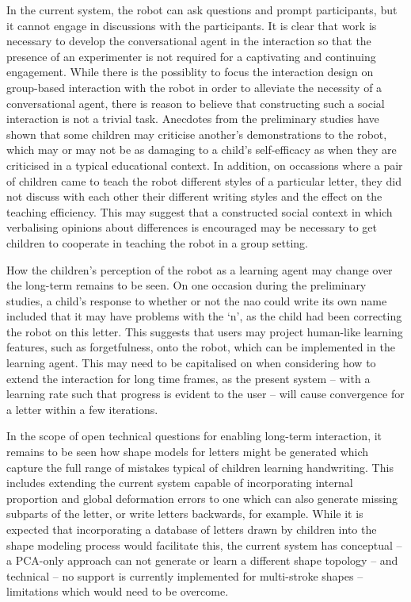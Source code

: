 \documentclass{sig-alternate}
\begin{document}
In the current system, the robot can ask questions and prompt participants, but it 
cannot engage in discussions with the participants. It is clear that work is necessary 
to develop the conversational agent in the interaction so that the presence of an 
experimenter is not required for a captivating and continuing engagement. While there is the 
possiblity to focus the interaction design on group-based interaction with the robot 
in order to alleviate the necessity of a conversational agent, there is reason to 
believe that constructing such a social interaction is not a trivial task. Anecdotes 
from the preliminary studies have shown that some children may criticise another's 
demonstrations to the robot, which may or may not be as damaging to a child's 
self-efficacy as when they are criticised in a typical educational context. In addition,
on occassions where a pair of children came to teach the robot different styles of a 
particular letter, they did not discuss with each other their different writing styles 
and the effect on the teaching efficiency. This may suggest that a constructed social context in 
which verbalising opinions about differences is encouraged may be necessary to get children 
to cooperate in teaching the robot in a group setting.  

How the children's perception of the robot as a learning agent may change over the 
long-term remains to be seen. On one occasion during the preliminary studies, a 
child's response to whether or not the {\sc nao} could write its own name included that it 
may have problems with the `n', as the child had been correcting the robot on this 
letter. This suggests that users may project human-like learning features, such as 
forgetfulness, onto the robot, which can be implemented 
in the learning agent. This may need to be capitalised on when considering how to 
extend the interaction for long time frames, as the present system -- with a learning rate 
such that progress is evident to the user -- will cause convergence for a letter within a 
few iterations.

In the scope of open technical questions for enabling long-term interaction, it remains to be seen how shape models
for letters might be generated which capture the full range of mistakes typical
of children learning handwriting. This includes extending the current system capable of
incorporating internal proportion and global deformation errors to one which can
also generate missing subparts of the letter, or write letters backwards, for example. 
While it is expected that incorporating a
database of letters drawn by children into the shape modeling process would
facilitate this, the current system has conceptual -- a PCA-only approach can not
generate or learn a different shape topology -- and technical -- no support is currently implemented for
multi-stroke shapes -- limitations which would need to be overcome.
\end{document}
